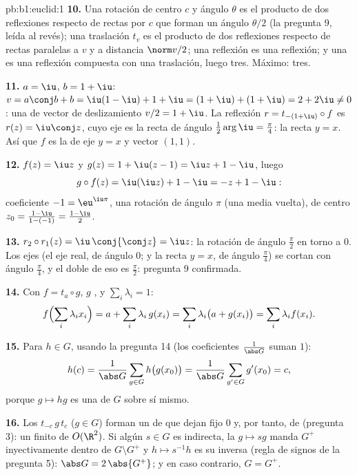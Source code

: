 \begin{solution}{pb:b1:euclid:1}
\textbf{10.} Una rotación de centro $c$ y ángulo $\theta$ es el
producto de dos reflexiones respecto de rectas por $c$ que forman un
ángulo $\theta/2$ (la pregunta 9, leída al revés); una traslación
$t_v$ es el producto de dos reflexiones respecto de rectas paralelas
 a $v$ y a distancia $\norm v/2$; una reflexión es una
reflexión; y una  es una reflexión compuesta con
una traslación, luego tres. Máximo: tres.

\textbf{11.} $a = \iu$, $b = 1 + \iu$:
$v = a\conj b + b = \iu(1 - \iu) + 1 + \iu = (1 + \iu) + (1 + \iu) =
2 + 2\iu \neq 0$: una  de vector de
deslizamiento $v/2 = 1 + \iu$. La reflexión
$r = t_{-(1+\iu)}\circ f$ es $r(z) = \iu\conj z$, cuyo eje es la
recta de ángulo $\frac12\arg\iu = \frac\pi4$: la recta $y = x$. Así
que $f$ es la  de eje $y = x$ y vector $(1, 1)$.

\textbf{12.} $f(z) = \iu z$ y
$g(z) = 1 + \iu(z - 1) = \iu z + 1 - \iu$, luego
\[
g\circ f(z) = \iu(\iu z) + 1 - \iu = -z + 1 - \iu :
\]
coeficiente  $-1 = \eu^{\iu\pi}$, una rotación de ángulo
$\pi$ (una media vuelta), de centro
$z_0 = \frac{1 - \iu}{1 - (-1)} = \frac{1 - \iu}{2}$.

\textbf{13.} $r_2\circ r_1(z) = \iu\,\conj{\conj z} = \iu z$: la
rotación de ángulo $\frac\pi2$ en torno a $0$. Los ejes (el eje real,
de ángulo $0$; y la recta $y = x$, de ángulo $\frac\pi4$) se cortan
con ángulo $\frac\pi4$, y el doble de eso es $\frac\pi2$: pregunta 9
confirmada.

\textbf{14.} Con $f = t_a\circ g$, $g$ , y
$\sum_i \lambda_i = 1$:
\[
f\Bigl(\sum_i \lambda_i x_i\Bigr)
= a + \sum_i \lambda_i\,g(x_i)
= \sum_i \lambda_i\bigl(a + g(x_i)\bigr)
= \sum_i \lambda_i f(x_i) .
\]

\textbf{15.} Para $h \in G$, usando la pregunta 14 (los coeficientes
$\frac1{\abs G}$ suman $1$):
\[
h(c) = \frac{1}{\abs G}\sum_{g \in G} h\bigl(g(x_0)\bigr)
= \frac{1}{\abs G}\sum_{g' \in G} g'(x_0) = c ,
\]
porque $g \mapsto hg$ es una  de $G$ sobre sí mismo.

\textbf{16.} Los  $t_{-c}\,g\,t_{c}$ ($g \in G$) forman un
 de  que dejan fijo $0$ y, por tanto, de 
\emph{} (pregunta 3): un  finito de $O(\R^2)$. Si
algún $s \in G$ es indirecta, la  $g \mapsto sg$ manda
$G^+$ inyectivamente dentro de $G\setminus G^+$ y
$h \mapsto s^{-1}h$ es su inversa (regla de signos de la pregunta 5):
$\abs G = 2\,\abs{G^+}$; y en caso contrario, $G = G^+$.


\end{solution}
